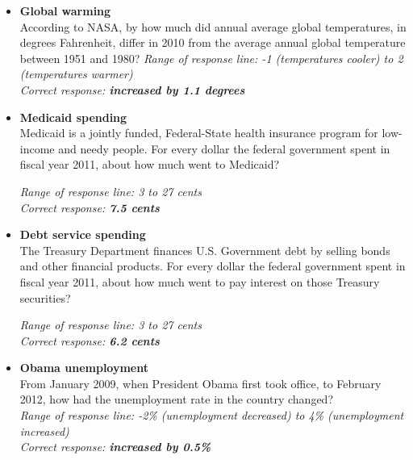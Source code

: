 \documentclass[12pt, letterpaper]{article}
\begin{document}
   \begin{itemize}
\item \textbf{Global warming} \\
According to NASA, by how much did annual average global temperatures, in degrees Fahrenheit, differ in 2010 from the average annual global temperature between 1951 and 1980?
 \textit{Range of response line: -1 (temperatures cooler) to 2 (temperatures warmer)}
\\ \textit{Correct response: \textbf{increased by 1.1 degrees}}
   \end{itemize}

\begin{itemize}
\item \textbf{Medicaid spending} \\
Medicaid is a jointly funded, Federal-State health insurance program for low-income and needy people. For every dollar the federal government spent in fiscal year 2011, about how much went to Medicaid?

 \textit{Range of response line: 3 to 27 cents}
\\ \textit{Correct response: \textbf{7.5 cents}}
   \end{itemize}

\begin{itemize}
\item \textbf{Debt service spending} \\
The Treasury Department finances U.S. Government debt by selling bonds and other financial products. For every dollar the federal government spent in fiscal year 2011, about how much went to pay interest on those Treasury securities?

 \textit{Range of response line: 3 to 27 cents}
\\ \textit{Correct response: \textbf{6.2 cents}}
   \end{itemize}

\begin{itemize}
\item \textbf{Obama unemployment} \\
From January 2009, when President Obama first took office, to February 2012, how had the unemployment rate in the country changed?
\\ \textit{Range of response line: -2\% (unemployment decreased) to 4\% (unemployment increased)}
\\ \textit{Correct response: \textbf{increased by 0.5\%}}
   \end{itemize}
\end{document}
